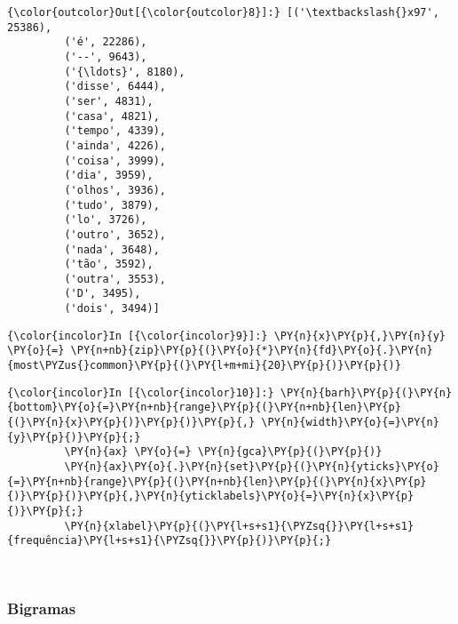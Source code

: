             \begin{Verbatim}[commandchars=\\\{\}]
{\color{outcolor}Out[{\color{outcolor}8}]:} [('\textbackslash{}x97', 25386),
         ('é', 22286),
         ('--', 9643),
         ('{\ldots}', 8180),
         ('disse', 6444),
         ('ser', 4831),
         ('casa', 4821),
         ('tempo', 4339),
         ('ainda', 4226),
         ('coisa', 3999),
         ('dia', 3959),
         ('olhos', 3936),
         ('tudo', 3879),
         ('lo', 3726),
         ('outro', 3652),
         ('nada', 3648),
         ('tão', 3592),
         ('outra', 3553),
         ('D', 3495),
         ('dois', 3494)]
\end{Verbatim}
        
    \begin{Verbatim}[commandchars=\\\{\}]
{\color{incolor}In [{\color{incolor}9}]:} \PY{n}{x}\PY{p}{,}\PY{n}{y} \PY{o}{=} \PY{n+nb}{zip}\PY{p}{(}\PY{o}{*}\PY{n}{fd}\PY{o}{.}\PY{n}{most\PYZus{}common}\PY{p}{(}\PY{l+m+mi}{20}\PY{p}{)}\PY{p}{)}
\end{Verbatim}

    \begin{Verbatim}[commandchars=\\\{\}]
{\color{incolor}In [{\color{incolor}10}]:} \PY{n}{barh}\PY{p}{(}\PY{n}{bottom}\PY{o}{=}\PY{n+nb}{range}\PY{p}{(}\PY{n+nb}{len}\PY{p}{(}\PY{n}{x}\PY{p}{)}\PY{p}{)}\PY{p}{,} \PY{n}{width}\PY{o}{=}\PY{n}{y}\PY{p}{)}\PY{p}{;}
         \PY{n}{ax} \PY{o}{=} \PY{n}{gca}\PY{p}{(}\PY{p}{)}
         \PY{n}{ax}\PY{o}{.}\PY{n}{set}\PY{p}{(}\PY{n}{yticks}\PY{o}{=}\PY{n+nb}{range}\PY{p}{(}\PY{n+nb}{len}\PY{p}{(}\PY{n}{x}\PY{p}{)}\PY{p}{)}\PY{p}{,}\PY{n}{yticklabels}\PY{o}{=}\PY{n}{x}\PY{p}{)}\PY{p}{;}
         \PY{n}{xlabel}\PY{p}{(}\PY{l+s+s1}{\PYZsq{}}\PY{l+s+s1}{frequência}\PY{l+s+s1}{\PYZsq{}}\PY{p}{)}\PY{p}{;}
\end{Verbatim}

    \begin{center}
    \end{center}
    { \hspace*{\fill} \\}
    
    \subsubsection{Bigramas}\label{bigramas}

